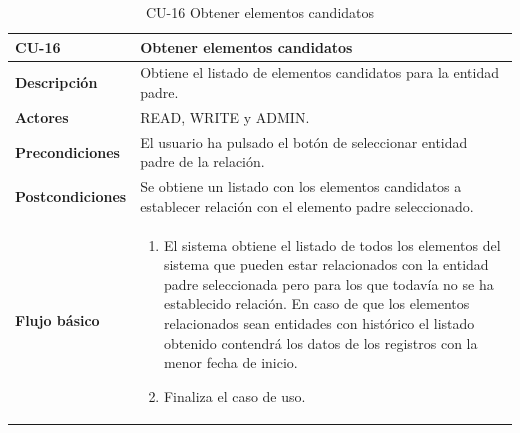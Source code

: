 \begin{table} [H]
    \centering
    \setlength{\leftmargini}{0.4cm}
	\resizebox{14cm}{!} { %
    \begin{tabular}{| m{3cm} | m{11cm} |}   
    \hline
	  \textbf{CU-16} & \textbf{Obtener elementos candidatos} \\\hline
	  \textbf{Descripción} & Obtiene el listado de elementos candidatos para la entidad padre. \\\hline
	  \textbf{Actores} & READ, WRITE y ADMIN. \\\hline
	  \textbf{Precondiciones} & El usuario ha pulsado el botón de seleccionar entidad padre de la relación. \\\hline
	  \textbf{Postcondiciones} & Se obtiene un listado con los elementos candidatos a establecer relación con el elemento padre seleccionado. \\\hline
	  \textbf{Flujo básico} & 
		\begin{enumerate}
	  	\item El sistema obtiene el listado de todos los elementos del sistema que pueden estar relacionados con la entidad padre seleccionada pero para los que todavía no se ha establecido relación. En caso de que los elementos relacionados sean entidades con histórico el listado obtenido contendrá los datos de los registros con la menor fecha de inicio.
		\item Finaliza el caso de uso.				
	  \end{enumerate} 	  	  
	  \\\hline
    \end{tabular}
    } %
    \caption{CU-16 Obtener elementos candidatos}
    \label{tab:cu-obtener-elementos-candidatos}
\end{table}



